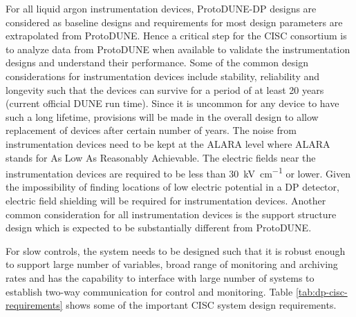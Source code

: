 
For all liquid argon instrumentation devices, ProtoDUNE-DP designs are
considered as baseline designs and requirements for most design
parameters are extrapolated from ProtoDUNE. Hence a critical step for
the CISC consortium is to analyze data from ProtoDUNE when available
to validate the instrumentation designs and understand their
performance. Some of the common design considerations for
instrumentation devices include stability, reliability and longevity
such that the devices can survive for a period of at least 20 years
(current official DUNE run time).  Since it is uncommon for any device
to have such a long lifetime, provisions will be made in the overall
design to allow replacement of devices after certain number of
years. The noise from instrumentation devices need to be kept at the
ALARA level where ALARA stands for As Low As Reasonably
Achievable. The electric fields near the instrumentation devices are required
to be less than \SI{30}{kV\per\cm} or lower. Given the impossibility
of finding locations of low electric potential in a DP detector,
electric field shielding will be required for instrumentation
devices. Another common consideration for all instrumentation devices
is the support structure design which is expected to be substantially
different from ProtoDUNE.

For slow controls, the system needs to be designed such that it is
robust enough to support large number of variables, broad range of
monitoring and archiving rates and has the capability to interface
with large number of systems to establish two-way communication for
control and monitoring. Table \ref{tab:dp-cisc-requirements} shows
some of the important CISC system design requirements.




